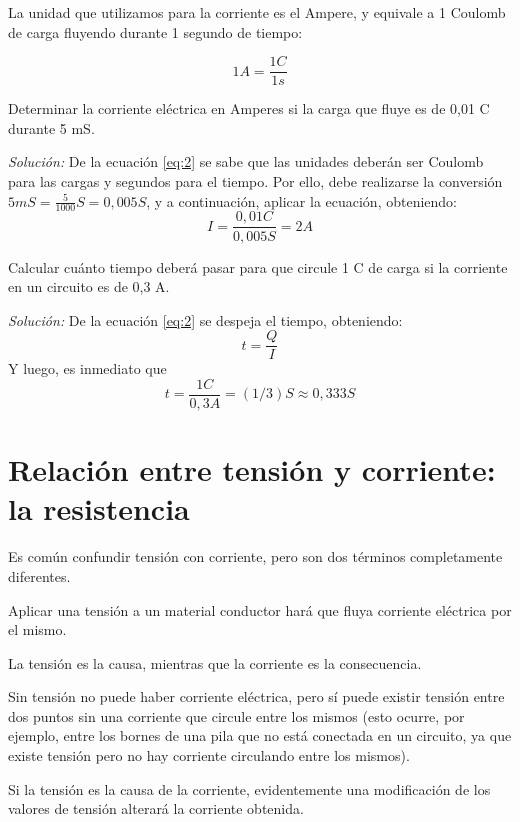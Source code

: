 La unidad que utilizamos para la corriente es el Ampere, y equivale a 1 Coulomb de carga fluyendo durante 1 segundo de tiempo:

$$ 1A = \frac{1C}{1s} $$

\begin{ejemplo}
	Determinar la corriente eléctrica en Amperes si la carga que fluye es de 0,01 C durante 5 mS.
	
	\emph{Solución:} De la ecuación \ref{eq:2} se sabe que las unidades deberán ser Coulomb para las cargas y segundos para el tiempo. Por ello, debe realizarse la conversión $5mS=\frac{5}{1000} S =0,005 S$, y a continuación, aplicar la ecuación, obteniendo: $$ I= \frac{0,01 C}{0,005 S} = 2 A $$
\end{ejemplo}

\begin{ejemplo}
	Calcular cuánto tiempo deberá pasar para que circule 1 C de carga si la corriente en un circuito es de 0,3 A.
	
	\emph{Solución:} De la ecuación \ref{eq:2} se despeja el tiempo, obteniendo: 
	\begin{equation}
		\label{eq:3}
		t=\frac{Q}{I}
	\end{equation}
	Y luego, es inmediato que $$ t=\frac{1C}{0,3A}=(1/3)S \approx 0,333 S $$
\end{ejemplo}

\section{Relación entre tensión y corriente: la resistencia}

Es común confundir tensión con corriente, pero son dos términos completamente diferentes.

Aplicar una tensión a un material conductor hará que fluya corriente eléctrica por el mismo.

La tensión es la causa, mientras que la corriente es la consecuencia.

Sin tensión no puede haber corriente eléctrica, pero sí puede existir tensión entre dos puntos sin una corriente que circule entre los mismos (esto ocurre, por ejemplo, entre los bornes de una pila que no está conectada en un circuito, ya que existe tensión pero no hay corriente circulando entre los mismos).

Si la tensión es la causa de la corriente, evidentemente una modificación de los valores de tensión alterará la corriente obtenida.

